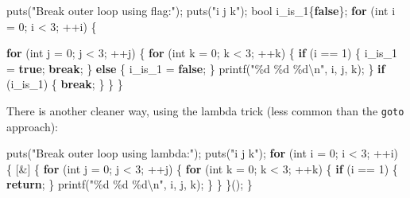 \documentclass[
]{book}
\newenvironment{Shaded}{\begin{snugshade}}{\end{snugshade}}
\newcommand{\ControlFlowTok}[1]{\textcolor[rgb]{0.13,0.29,0.53}{\textbf{#1}}}
\newcommand{\DataTypeTok}[1]{\textcolor[rgb]{0.13,0.29,0.53}{#1}}
\newcommand{\DecValTok}[1]{\textcolor[rgb]{0.00,0.00,0.81}{#1}}
\newcommand{\KeywordTok}[1]{\textcolor[rgb]{0.13,0.29,0.53}{\textbf{#1}}}
\newcommand{\NormalTok}[1]{#1}
\newcommand{\SpecialCharTok}[1]{\textcolor[rgb]{0.00,0.00,0.00}{#1}}
\newcommand{\StringTok}[1]{\textcolor[rgb]{0.31,0.60,0.02}{#1}}
\begin{document}
\begin{Shaded}
\begin{Highlighting}[]
\NormalTok{puts(}\StringTok{"Break outer loop using flag:"}\NormalTok{);}
\NormalTok{puts(}\StringTok{"i j k"}\NormalTok{);}
\DataTypeTok{bool}\NormalTok{ i\_is\_1\{}\KeywordTok{false}\NormalTok{\};}
\ControlFlowTok{for}\NormalTok{ (}\DataTypeTok{int}\NormalTok{ i = }\DecValTok{0}\NormalTok{; i \textless{} }\DecValTok{3}\NormalTok{; ++i)}
\NormalTok{\{}

    \ControlFlowTok{for}\NormalTok{ (}\DataTypeTok{int}\NormalTok{ j = }\DecValTok{0}\NormalTok{; j \textless{} }\DecValTok{3}\NormalTok{; ++j)}
\NormalTok{    \{}
        \ControlFlowTok{for}\NormalTok{ (}\DataTypeTok{int}\NormalTok{ k = }\DecValTok{0}\NormalTok{; k \textless{} }\DecValTok{3}\NormalTok{; ++k)}
\NormalTok{        \{}
            \ControlFlowTok{if}\NormalTok{ (i == }\DecValTok{1}\NormalTok{)}
\NormalTok{            \{}
\NormalTok{                i\_is\_1 = }\KeywordTok{true}\NormalTok{;}
                \ControlFlowTok{break}\NormalTok{;}
\NormalTok{            \}}
            \ControlFlowTok{else}
\NormalTok{            \{}
\NormalTok{                i\_is\_1 = }\KeywordTok{false}\NormalTok{;}
\NormalTok{            \}}
\NormalTok{            printf(}\StringTok{"}\SpecialCharTok{\%d}\StringTok{ }\SpecialCharTok{\%d}\StringTok{ }\SpecialCharTok{\%d\textbackslash{}n}\StringTok{"}\NormalTok{, i, j, k);}
\NormalTok{        \}}
        \ControlFlowTok{if}\NormalTok{ (i\_is\_1)}
\NormalTok{        \{}
            \ControlFlowTok{break}\NormalTok{;}
\NormalTok{        \}}
\NormalTok{    \}}
\NormalTok{\}}
\end{Highlighting}
\end{Shaded}

There is another cleaner way, using the lambda trick (less common than the \texttt{goto} approach):

\begin{Shaded}
\begin{Highlighting}[]
\NormalTok{puts(}\StringTok{"Break outer loop using lambda:"}\NormalTok{);}
\NormalTok{puts(}\StringTok{"i j k"}\NormalTok{);}
\ControlFlowTok{for}\NormalTok{ (}\DataTypeTok{int}\NormalTok{ i = }\DecValTok{0}\NormalTok{; i \textless{} }\DecValTok{3}\NormalTok{; ++i)}
\NormalTok{\{}
\NormalTok{    [\&] \{}
        \ControlFlowTok{for}\NormalTok{ (}\DataTypeTok{int}\NormalTok{ j = }\DecValTok{0}\NormalTok{; j \textless{} }\DecValTok{3}\NormalTok{; ++j)}
\NormalTok{        \{}
            \ControlFlowTok{for}\NormalTok{ (}\DataTypeTok{int}\NormalTok{ k = }\DecValTok{0}\NormalTok{; k \textless{} }\DecValTok{3}\NormalTok{; ++k)}
\NormalTok{            \{}
                \ControlFlowTok{if}\NormalTok{ (i == }\DecValTok{1}\NormalTok{)}
\NormalTok{                \{}
                    \ControlFlowTok{return}\NormalTok{;}
\NormalTok{                \}}
\NormalTok{                printf(}\StringTok{"}\SpecialCharTok{\%d}\StringTok{ }\SpecialCharTok{\%d}\StringTok{ }\SpecialCharTok{\%d\textbackslash{}n}\StringTok{"}\NormalTok{, i, j, k);}
\NormalTok{            \}}
\NormalTok{        \}}
\NormalTok{    \}();}
\NormalTok{\}}
\end{Highlighting}
\end{Shaded}
\end{document}
